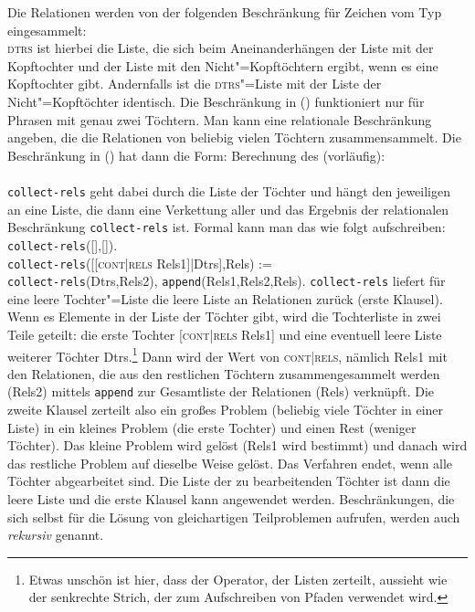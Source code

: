 Die Relationen werden von der folgenden Beschränkung für Zeichen vom Typ  eingesammelt:
\ea
\label{constraint-RELS}%
 \impl\\[1mm]
\z
\textsc{dtrs} ist hierbei die Liste, die sich beim Aneinanderhängen der Liste mit der Kopftochter
und der Liste mit den Nicht"=Kopftöchtern ergibt, wenn es eine Kopftochter gibt. Andernfalls
ist die \textsc{dtrs}"=Liste mit der Liste der Nicht"=Kopftöchter identisch. Die Beschränkung in
() funktioniert nur für Phrasen mit genau zwei Töchtern. Man kann eine relationale
Beschränkung angeben, die die Relationen von beliebig vielen Töchtern zusammensammelt. Die
Beschränkung in () hat dann die Form:
\ea
Berechnung des \relswes (vorläufig):\\
 \impl\\[1mm]
\z
\texttt{collect-rels} geht dabei durch die Liste der Töchter und hängt den jeweiligen \relsw an eine
Liste, die dann eine Verkettung aller \relswe und das Ergebnis der relationalen Beschränkung
\texttt{collect-rels} ist. Formal kann man das wie folgt aufschreiben:
\ea
\label{constraint-collect-rels}
\texttt{collect-rels}([],[]).\\
\texttt{collect-rels}([[\textsc{cont|rels} Rels1]|Dtrs],Rels) :=\\
\mbox{}\hfill \texttt{collect-rels}(Dtrs,Rels2), \texttt{append}(Rels1,Rels2,Rels).
\z
\texttt{collect-rels} liefert für eine leere Tochter"=Liste die leere Liste an Relationen zurück
(erste Klausel). Wenn es Elemente in der Liste der Töchter gibt, wird die Tochterliste in zwei Teile
geteilt: die erste Tochter [\textsc{cont|rels} Rels1] und eine eventuell leere Liste weiterer
Töchter Dtrs.\footnote{%
Etwas unschön ist hier, dass der Operator, der Listen zerteilt, aussieht wie der
senkrechte Strich, der zum Aufschreiben von Pfaden verwendet wird.} Dann wird der Wert von
\textsc{cont|rels}, nämlich Rels1 mit den Relationen, die aus den restlichen Töchtern
zusammengesammelt werden (Rels2) mittels \texttt{append} zur Gesamtliste der Relationen (Rels)
verknüpft. Die zweite Klausel zerteilt also ein großes Problem (beliebig viele Töchter in einer
Liste) in ein kleines Problem (die erste Tochter) und einen Rest (weniger Töchter). Das kleine
Problem wird gelöst (Rels1 wird bestimmt) und danach wird das restliche Problem auf dieselbe Weise
gelöst. Das Verfahren endet, wenn alle Töchter abgearbeitet sind. Die Liste der zu bearbeitenden
Töchter ist dann die leere Liste und die erste Klausel kann angewendet werden. Beschränkungen, die
sich selbst für die Lösung von gleichartigen Teilproblemen aufrufen, werden auch
\emph{rekursiv} genannt.  



